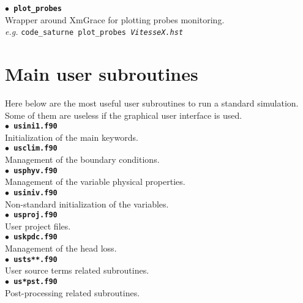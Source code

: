 \documentclass[a4paper,11pt]{article}
\newcommand{\refword}[1]{\texttt{$\bullet$ \bf{#1}}}
\begin{document}
\begin{multicols*}{3}
\refword{plot\_probes}\\
Wrapper around XmGrace for plotting probes monitoring.\\
\textit{e.g.} \texttt{code\_saturne plot\_probes \emph{VitesseX.hst}}


\section*{Main user subroutines}

Here below are the most useful user subroutines to run a standard
simulation. Some of them are useless if the graphical user interface
is used.\\

\refword{usini1.f90}\\
Initialization of the main keywords.\\

\refword{usclim.f90}\\
Management of the boundary conditions.\\

\refword{usphyv.f90}\\
Management of the variable physical properties.\\

\refword{usiniv.f90}\\
Non-standard initialization of the variables.\\

\refword{usproj.f90}\\
User project files.\\

\refword{uskpdc.f90}\\
Management of the head loss.\\

\refword{usts**.f90}\\
User source terms related subroutines.\\

\refword{us*pst.f90}\\
Post-processing related subroutines.\\





\end{multicols*}
\end{document}
